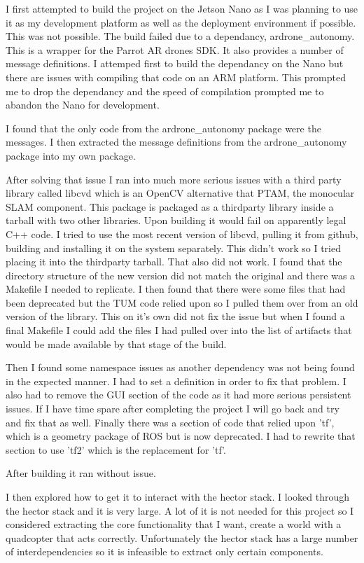 \documentclass[]{../resources/final_report}
\begin{document}
I first attempted to build the project on the Jetson Nano as I was planning to use it as my 
development platform as well as the deployment environment if possible. This was not possible. The 
build failed due to a dependancy, ardrone\_autonomy. This is a wrapper for the Parrot AR drones SDK. 
It also provides a number of message definitions. I attemped first to build the dependancy on the 
Nano but there are issues with compiling that code on an ARM platform. This prompted me to drop the 
dependancy and the speed of compilation prompted me to abandon the Nano for development.

I found that the only code from the ardrone\_autonomy package were the messages. I then extracted 
the message definitions from the ardrone\_autonomy package into my own package.

After solving that issue I ran into much more serious issues with a third party library called 
libcvd which is an OpenCV alternative that PTAM, the monocular SLAM component.
This package is packaged as a thirdparty library inside a tarball with two other libraries.
Upon building it would fail on apparently legal C++ code. I tried to use the most recent version of 
libcvd, pulling it from github, building and installing it on the system separately. This didn't work 
so I tried placing it into the thirdparty tarball. That also did not work. I found that the directory
structure of the new version did not match the original and there was a Makefile I needed to 
replicate. I then found that there were some files that had been deprecated but the TUM code relied 
upon so I pulled them over from an old version of the library. This on it's own did not fix the 
issue but when I found a final Makefile I could add the files I had pulled over into the list of 
artifacts that would be made available by that stage of the build. 

Then I found some namespace issues as another dependency was not being found in the expected manner.
I had to set a definition in order to fix that problem. I also had to remove the GUI section of the 
code as it had more serious persistent issues. If I have time spare after completing the project I 
will go back and try and fix that as well. Finally there was a section of code that relied upon 'tf', 
which is a geometry package of ROS but is now deprecated. I had to rewrite that section to use 'tf2' 
which is the replacement for 'tf'.

After building it ran without issue.

I then explored how to get it to interact with the hector stack. I looked through the hector stack and it is 
very large. A lot of it is not needed for this project so I considered extracting the core functionality
that I want, create a world with a quadcopter that acts correctly. Unfortunately the hector stack 
has a large number of interdependencies so it is infeasible to extract only certain components.
\end{document}
